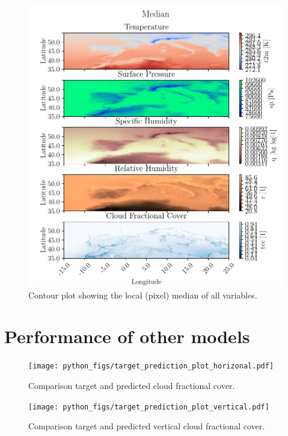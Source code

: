 
\cleardoublepage
\begin{figure}[ht]
    \centering
    \includegraphics{python_figs/contourplot_all_variables_median.pdf}
    \caption{Contour plot showing the local (pixel) median of all variables.}
    \label{fig:contour_mean_all_vars}
\end{figure}

\chapter{Performance of other models}


\begin{figure}[ht]
    \centering
    \texttt{[image: python\_figs/target\_prediction\_plot\_horizonal.pdf]}
    \caption{Comparison target and predicted cloud fractional cover.}
    \label{fig:target_predict_horizontal}
\end{figure}

\begin{figure}[ht]
    \centering
    \texttt{[image: python\_figs/target\_prediction\_plot\_vertical.pdf]}
    \caption{Comparison target and predicted vertical cloud fractional cover.}
    \label{fig:target_predict_vertical}
\end{figure}


